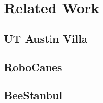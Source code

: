 \chapter{Related Work}
\label{related}

\section{UT Austin Villa}

\section{RoboCanes}

\section{BeeStanbul}

